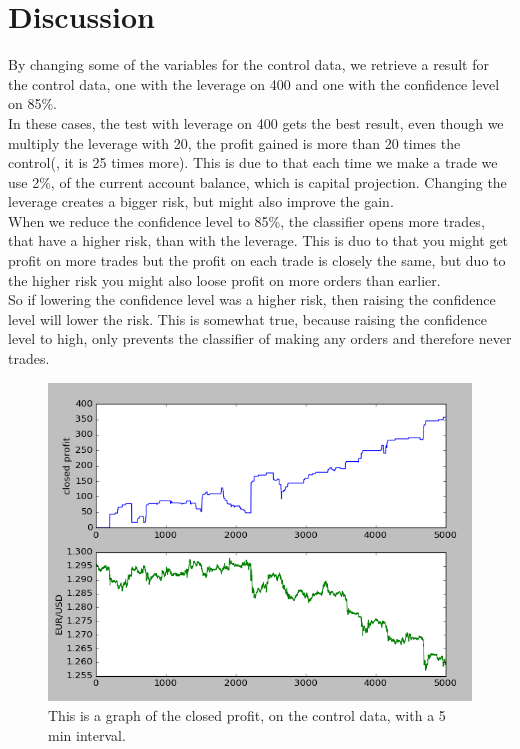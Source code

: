 \documentclass[10pt]{IEEEtran}
\begin{document}
\section{Discussion}

By changing some of the variables for the control data, we retrieve a result for the control data, one with the leverage on 400 and one with the confidence level on 85\%.\\
In these cases, the test with leverage on 400 gets the best result, even though we multiply the leverage with 20, the profit gained is more than 20 times the control(, it is 25 times more). This is due to that each time we make a trade we use 2\%, of the current account balance, which is capital projection. Changing the leverage creates a bigger risk, but might also improve the gain.\\
When we reduce the confidence level to 85\%, the classifier opens more trades, that have a higher risk, than with the leverage. This is duo to that you might get profit on more trades but the profit on each trade is closely the same, but duo to the higher risk you might also loose profit on more orders than earlier.\\
So if lowering the confidence level was a higher risk, then raising the confidence level will lower the risk. This is somewhat true, because raising the confidence level to high, only prevents the classifier of making any orders and therefore never trades.\\  
\begin{figure}[h]
    \includegraphics[scale = 0.4]{data-96-10000-20.png}
    \caption{This is a graph of the closed profit, on the control data, with a 5 min interval.}
\end{figure}
\end{document}
